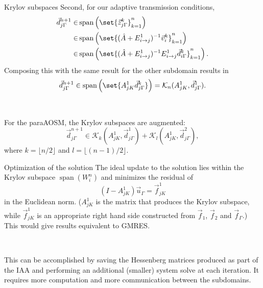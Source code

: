 \documentclass{beamer}
\DeclareMathOperator{\Span}{span}
\begin{document}
\begin{frame}{Krylov subspaces}
Second, for our adaptive transmission conditions,
\begin{align*}
	\vec{d}_{j \Gamma}^{n+1} \in & \Span \left ( \set{\vec{z}_{j \Gamma}^k}_{k=1}^n \right ) \\
		\in & \Span \left ( \set{(\hat{A} + E_{i \to j}^1)^{-1} \vec{v}_i^k}_{k=1}^n \right ) \\
		\in & \Span \left ( \set{ (\hat{A} + E_{i \to j}^1)^{-1} E_{i \to j}^1 \vec{d}_{i \Gamma}^k }_{k=1}^n \right ).
\end{align*}
Composing this with the same result for the other subdomain results in
\begin{equation*}
	\vec{d}_{j \Gamma}^{n+1} \in \Span \left ( \set{ A_{jK}^1 \vec{d}_{j \Gamma}^k} \right ) = \mathcal{K}_n(A_{jK}^1, \vec{d}_{j \Gamma}^1).
\end{equation*}

~

For the paraAOSM, the Krylov subspaces are augmented:
\begin{equation*}
	\vec{d}_{j \Gamma}^{n+1} \in \mathcal{K}_k(A_{jK}^1, \vec{d}_{j \Gamma}^1) + \mathcal{K}_l(A_{jK}^1, \vec{d}_{j \Gamma}^2),
\end{equation*}
where $k=\lfloor n/2 \rfloor$ and $l=\lfloor (n-1)/2 \rfloor$.
\end{frame}

\begin{frame}{Optimization of the solution}
The ideal update to the solution lies within the Krylov subspace $\Span(W_i^n)$ and minimizes the residual of
\begin{equation*}
	(I - A_{jK}^1) \vec{u}_\Gamma = \vec{f}_{jK}^{1}
\end{equation*}
in the Euclidean norm.
($A_{jK}^1$ is the matrix that produces the Krylov subspace, while $\vec{f}_{jK}^{1}$ is an appropriate right hand side constructed from $\vec{f}_1$, $\vec{f}_2$ and $\vec{f}_\Gamma$.)
This would give results equivalent to GMRES.

~

This can be accomplished by saving the Hessenberg matrices produced as part of the IAA and performing an additional (smaller) system solve at each iteration.
It requires more computation and more communication between the subdomains.
\end{frame}
\end{document}
